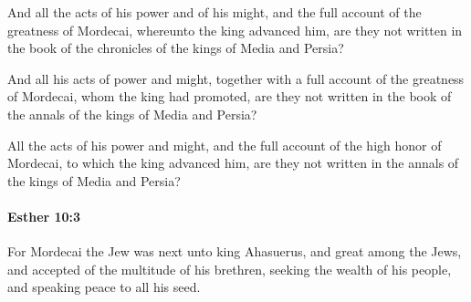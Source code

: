 			\begin{versebox}
					\item[BHS] 
					\item[LXX] 
					\item[ASV] And all the acts of his power and of his might, and the full account of the greatness of Mordecai, whereunto the king advanced him, are they not written in the book of the chronicles of the kings of Media and Persia?
					\item[NIV] And all his acts of power and might, together with a full account of the greatness of Mordecai, whom the king had promoted, are they not written in the book of the annals of the kings of Media and Persia?
					\item[NRSV] All the acts of his power and might, and the full account of the high honor of Mordecai, to which the king advanced him, are they not written in the annals of the kings of Media and Persia?
			\end{versebox}

		\paragraph{Esther 10:3} %
			\label{ESTHER-10-3}

			For Mordecai the Jew was next unto king Ahasuerus, and great among the Jews, and accepted of the multitude of his brethren, seeking the wealth of his people, and speaking peace to all his seed.

